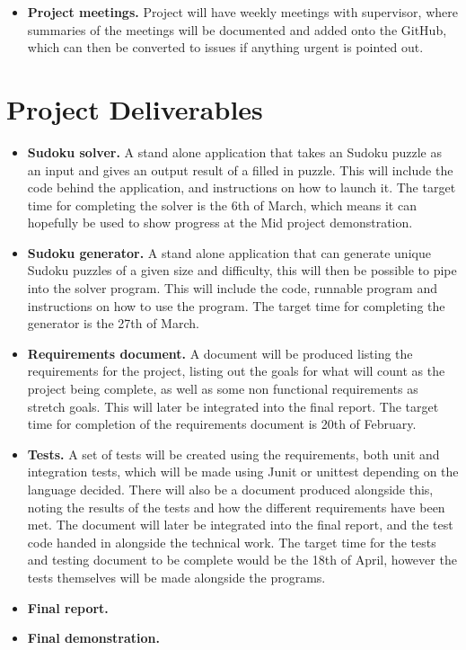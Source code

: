 \documentclass[a4paper,10pt]{article}
\begin{document}
\begin{itemize}
\begin{itemize}
	\end{itemize} 
	\item \textbf{Project meetings.} Project will have weekly meetings with supervisor, where summaries of the meetings will be documented and added onto the GitHub, which can then be converted to issues if anything urgent is pointed out.
\end{itemize}
\section*{Project Deliverables}
\begin{itemize}
	\item \textbf{Sudoku solver.} A stand alone application that takes an Sudoku puzzle as an input and gives an output result of a filled in puzzle. This will include the code behind the application, and instructions on how to launch it. The target time for completing the solver is the 6th of March, which means it can hopefully be used to show progress at the Mid project demonstration.
	\item \textbf{Sudoku generator.} A stand alone application that can generate unique Sudoku puzzles of a given size and difficulty, this will then be possible to pipe into the solver program. This will include the code, runnable program and instructions on how to use the program. The target time for completing the generator is the 27th of March.
	\item \textbf{Requirements document.} A document will be produced listing the requirements for the project, listing out the goals for what will count as the project being complete, as well as some non functional requirements as stretch goals. This will later be integrated into the final report. The target time for completion of the requirements document is 20th of February.
	\item \textbf{Tests.} A set of tests will be created using the requirements, both unit and integration tests, which will be made using Junit or unittest depending on the language decided. There will also be a document produced alongside this, noting the results of the tests and how the different requirements have been met. The document will later be integrated into the final report, and the test code handed in alongside the technical work. The target time for the tests and testing document to be complete would be the 18th of April, however the tests themselves will be made alongside the programs.
	\item \textbf{Final report.}
	\item \textbf{Final demonstration.}
\end{itemize}
\end{document}
